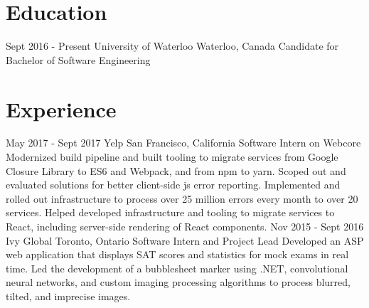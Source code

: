 \documentclass{resume}
\begin{document}
  \begin{main}
    \vspace{5pt}%
    \section{Education}
      \begin{entrylist}
        \rightentry%
        {Sept 2016 - Present}%
        {University of Waterloo}%
        {Waterloo, Canada}%
        {Candidate for Bachelor of Software Engineering}%
        {}
      \end{entrylist}
    \section{Experience}
      \begin{entrylist}
        \rightentry%
          {May 2017 - Sept 2017}%
          {Yelp}%
          {San Francisco, California}%
          {Software Intern on Webcore}%
          {%
            Modernized build pipeline and built %
            tooling to migrate services from Google Closure Library to ES6 and %
            Webpack, and from npm to yarn. Scoped out and evaluated solutions %
            for better client-side js error reporting. Implemented and rolled %
            out infrastructure to process over 25 million errors every month %
            to over 20 services. Helped developed infrastructure and tooling %
            to migrate services to React, including server-side rendering of %
            React components.%
          }
        \rightentry%
          {Nov 2015 - Sept 2016}%
          {Ivy Global}%
          {Toronto, Ontario}%
          {Software Intern and Project Lead}%
          {%
            Developed an ASP web application that displays SAT scores and statistics %
            for mock exams in real time. Led the development of a bubblesheet marker %
            using .NET, convolutional neural networks, and custom imaging processing %
            algorithms to process blurred, tilted, and imprecise images.%
          }
      \end{entrylist}

\end{main}
\end{document}
